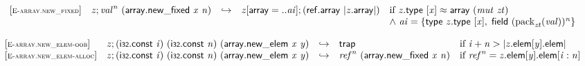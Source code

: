 $$
\begin{array}{@{}l@{}lcl@{}l@{}}
{[\textsc{\scriptsize E{-}array.new\_fixed}]} \quad & {\mathit{z}} ; {{\mathit{val}}^{{\mathit{n}}}}~(\mathsf{array.new\_fixed}~{\mathit{x}}~{\mathit{n}}) &\hookrightarrow& {\mathit{z}}[\mathsf{array} = ..{\mathit{ai}}] ; (\mathsf{ref.array}~{|{\mathit{z}}.\mathsf{array}|}) &\quad
  \mbox{if}~{\mathit{z}}.\mathsf{type}~[{\mathit{x}}] \approx \mathsf{array}~({\mathit{mut}}~{\mathit{zt}}) \\
 &&&&\quad {\land}~{\mathit{ai}} = \{ \begin{array}[t]{@{}l@{}}
\mathsf{type}~{\mathit{z}}.\mathsf{type}~[{\mathit{x}}],\; \mathsf{field}~{({{\mathrm{pack}}}_{{\mathit{zt}}}({\mathit{val}}))^{{\mathit{n}}}} \}\end{array} \\
\end{array}
$$

\vspace{1ex}

$$
\begin{array}{@{}l@{}lcl@{}l@{}}
{[\textsc{\scriptsize E{-}array.new\_elem{-}oob}]} \quad & {\mathit{z}} ; (\mathsf{i{\scriptstyle32}}.\mathsf{const}~{\mathit{i}})~(\mathsf{i{\scriptstyle32}}.\mathsf{const}~{\mathit{n}})~(\mathsf{array.new\_elem}~{\mathit{x}}~{\mathit{y}}) &\hookrightarrow& \mathsf{trap} &\quad
  \mbox{if}~{\mathit{i}} + {\mathit{n}} > {|{{\mathit{z}}.\mathsf{elem}}{[{\mathit{y}}]}.\mathsf{elem}|} \\
{[\textsc{\scriptsize E{-}array.new\_elem{-}alloc}]} \quad & {\mathit{z}} ; (\mathsf{i{\scriptstyle32}}.\mathsf{const}~{\mathit{i}})~(\mathsf{i{\scriptstyle32}}.\mathsf{const}~{\mathit{n}})~(\mathsf{array.new\_elem}~{\mathit{x}}~{\mathit{y}}) &\hookrightarrow& {{\mathit{ref}}^{{\mathit{n}}}}~(\mathsf{array.new\_fixed}~{\mathit{x}}~{\mathit{n}}) &\quad
  \mbox{if}~{{\mathit{ref}}^{{\mathit{n}}}} = {{\mathit{z}}.\mathsf{elem}}{[{\mathit{y}}]}.\mathsf{elem}[{\mathit{i}} : {\mathit{n}}] \\
\end{array}
$$

\vspace{1ex}

